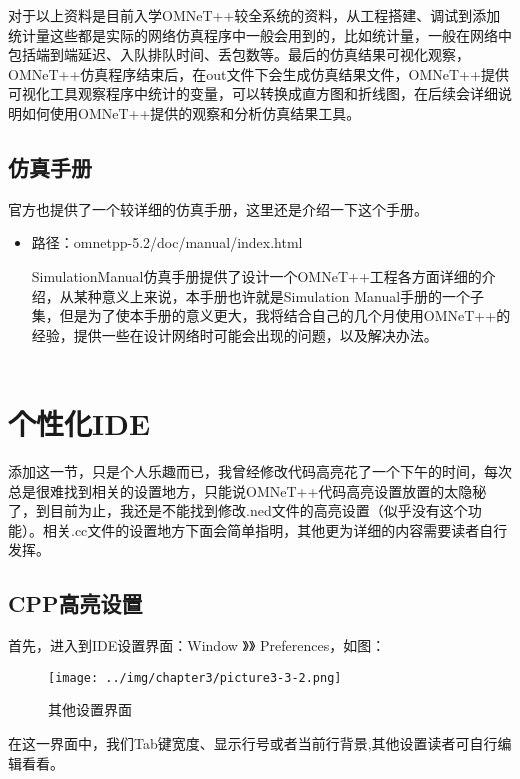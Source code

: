 对于以上资料是目前入学OMNeT++较全系统的资料，从工程搭建、调试到添加统计量这些都是实际的网络仿真程序中一般会用到的，比如统计量，一般在网络中包括端到端延迟、入队排队时间、丢包数等。最后的仿真结果可视化观察，OMNeT++仿真程序结束后，在out文件下会生成仿真结果文件，OMNeT++提供可视化工具观察程序中统计的变量，可以转换成直方图和折线图，在后续会详细说明如何使用OMNeT++提供的观察和分析仿真结果工具。\\

\subsection{仿真手册}
官方也提供了一个较详细的仿真手册，这里还是介绍一下这个手册。\\

\begin{itemize}
\item 路径：omnetpp-5.2/doc/manual/index.html

SimulationManual仿真手册提供了设计一个OMNeT++工程各方面详细的介绍，从某种意义上来说，本手册也许就是Simulation Manual手册的一个子集，但是为了使本手册的意义更大，我将结合自己的几个月使用OMNeT++的经验，提供一些在设计网络时可能会出现的问题，以及解决办法。\\ \\
\end{itemize}

\section{个性化IDE}

添加这一节，只是个人乐趣而已，我曾经修改代码高亮花了一个下午的时间，每次总是很难找到相关的设置地方，只能说OMNeT++代码高亮设置放置的太隐秘了，到目前为止，我还是不能找到修改.ned文件的高亮设置（似乎没有这个功能）。相关.cc文件的设置地方下面会简单指明，其他更为详细的内容需要读者自行发挥。\\
\subsection{CPP高亮设置}

首先，进入到IDE设置界面：Window 》》  Preferences，如图：

\begin{figure}
	\centering
	\texttt{[image: ../img/chapter3/picture3-3-2.png]}
	\caption{其他设置界面}\label{fig:1a}		
\end{figure}

在这一界面中，我们Tab键宽度、显示行号或者当前行背景,其他设置读者可自行编辑看看。








